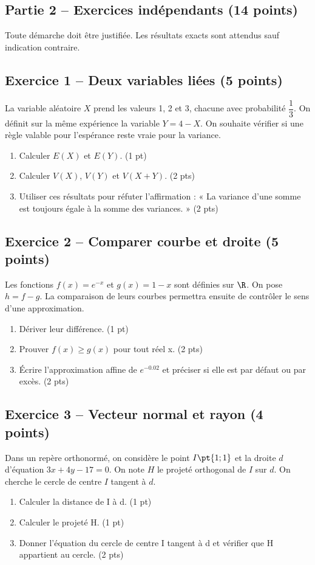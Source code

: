\mxnewpage\subsection*{Partie 2 -- Exercices indépendants (14 points)}
Toute démarche doit être justifiée. Les résultats exacts sont attendus sauf indication contraire.
\subsection*{Exercice 1 -- Deux variables liées (5 points)}
La variable aléatoire $X$ prend les valeurs 1, 2 et 3, chacune avec probabilité $\dfrac13$. On définit sur la même expérience la variable $Y=4-X$. On souhaite vérifier si une règle valable pour l’espérance reste vraie pour la variance.
\begin{enumerate}
\item Calculer $E(X)$ et $E(Y)$. \hfill(1 pt)
\item Calculer $V(X)$, $V(Y)$ et $V(X+Y)$. \hfill(2 pts)
\item Utiliser ces résultats pour réfuter l’affirmation : « La variance d’une somme est toujours égale à la somme des variances. » \hfill(2 pts)
\end{enumerate}
\subsection*{Exercice 2 -- Comparer courbe et droite (5 points)}
Les fonctions $f(x)=e^{-x}$ et $g(x)=1-x$ sont définies sur $\R$. On pose $h=f-g$. La comparaison de leurs courbes permettra ensuite de contrôler le sens d’une approximation.
\begin{enumerate}
\item Dériver leur différence. \hfill(1 pt)
\item Prouver $f(x)\geq g(x)$ pour tout réel x. \hfill(2 pts)
\item Écrire l’approximation affine de $e^{-\num{0,02}}$ et préciser si elle est par défaut ou par excès. \hfill(2 pts)
\end{enumerate}
\subsection*{Exercice 3 -- Vecteur normal et rayon (4 points)}
Dans un repère orthonormé, on considère le point $I\pt{1;1}$ et la droite $d$ d’équation $3x+4y-17=0$. On note $H$ le projeté orthogonal de $I$ sur $d$. On cherche le cercle de centre $I$ tangent à $d$.
\begin{enumerate}
\item Calculer la distance de I à d. \hfill(1 pt)
\item Calculer le projeté H. \hfill(1 pt)
\item Donner l’équation du cercle de centre I tangent à d et vérifier que H appartient au cercle. \hfill(2 pts)
\end{enumerate}
